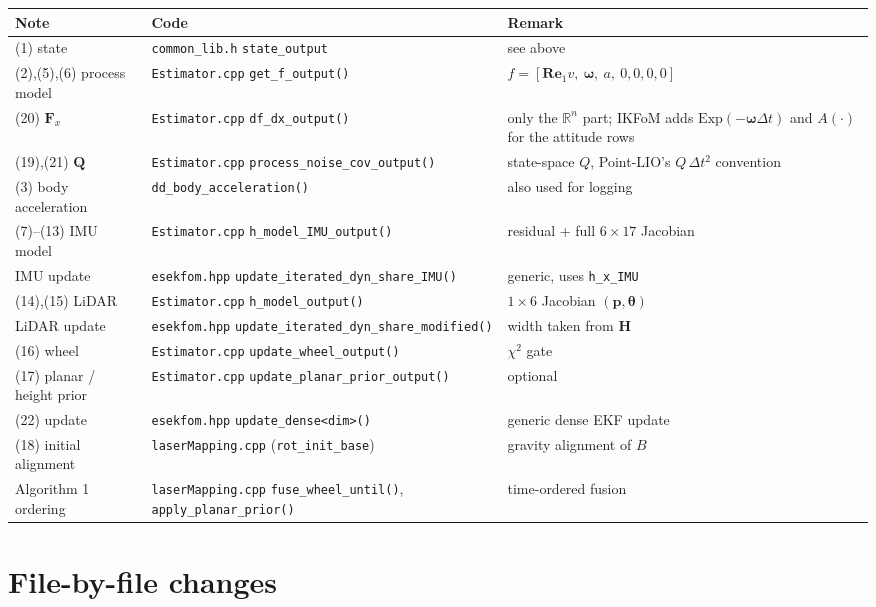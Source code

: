 \documentclass[11pt,a4paper]{article}
\newcommand{\f}[1]{\texttt{#1}}
\newcommand{\R}{\mathbf{R}}
\newcommand{\p}{\mathbf{p}}
\newcommand{\w}{\bm{\omega}}
\newcommand{\e}{\mathbf{e}}
\begin{document}
{\small\begin{longtable}{@{}>{\raggedright\arraybackslash}p{3.4cm}>{\raggedright\arraybackslash}p{6.2cm}>{\raggedright\arraybackslash}p{5.6cm}@{}}
\toprule
Note & Code & Remark\\
\midrule\endhead
(1) state & \f{common\_lib.h} \f{state\_output} & see above\\
(2),(5),(6) process model & \f{Estimator.cpp} \f{get\_f\_output()} & $f=[\R\e_1v,\ \w,\ a,\ 0,0,0,0]$\\
(20) $\mathbf F_x$ & \f{Estimator.cpp} \f{df\_dx\_output()} & only the $\mathbb R^n$ part; IKFoM adds $\mathrm{Exp}(-\w\Delta t)$ and $A(\cdot)$ for the attitude rows\\
(19),(21) $\mathbf Q$ & \f{Estimator.cpp} \f{process\_noise\_cov\_output()} & state-space $Q$, Point-LIO's $Q\,\Delta t^2$ convention\\
(3) body acceleration & \f{dd\_body\_acceleration()} & also used for logging\\
(7)--(13) IMU model & \f{Estimator.cpp} \f{h\_model\_IMU\_output()} & residual + full $6\times17$ Jacobian\\
IMU update & \f{esekfom.hpp} \f{update\_iterated\_dyn\_share\_IMU()} & generic, uses \f{h\_x\_IMU}\\
(14),(15) LiDAR & \f{Estimator.cpp} \f{h\_model\_output()} & $1\times6$ Jacobian $(\p,\bm\theta)$\\
LiDAR update & \f{esekfom.hpp} \f{update\_iterated\_dyn\_share\_modified()} & width taken from $\mathbf H$\\
(16) wheel & \f{Estimator.cpp} \f{update\_wheel\_output()} & $\chi^2$ gate\\
(17) planar / height prior & \f{Estimator.cpp} \f{update\_planar\_prior\_output()} & optional\\
(22) update & \f{esekfom.hpp} \f{update\_dense<dim>()} & generic dense EKF update\\
(18) initial alignment & \f{laserMapping.cpp} (\f{rot\_init\_base}) & gravity alignment of $B$\\
Algorithm 1 ordering & \f{laserMapping.cpp} \f{fuse\_wheel\_until()}, \f{apply\_planar\_prior()} & time-ordered fusion\\
\bottomrule
\end{longtable}}

\section{File-by-file changes}
\end{document}
